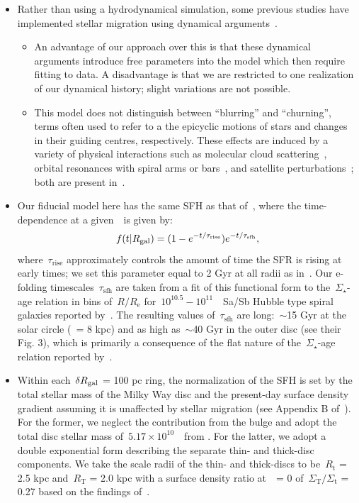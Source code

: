\documentclass[ms.tex]{subfiles}
\begin{document}
\begin{itemize}
	\item Rather than using a hydrodynamical simulation, some previous studies 
	have implemented stellar migration using dynamical 
	arguments~\citep[e.g.][]{Schoenrich2009, Sharma2020}. 
	\begin{itemize} 
		\item An advantage of our approach over this is that these dynamical 
		arguments introduce free parameters into the model which then require 
		fitting to data. 
		A disadvantage is that we are restricted to one realization of our 
		dynamical history; slight variations are not possible. 

		\item This model does not distinguish between ``blurring'' and 
		``churning'', terms often used to refer to a the epicyclic motions of 
		stars and changes in their guiding centres, respectively. 
		These effects are induced by a variety of physical interactions such as 
		molecular cloud scattering~\citep{Mihalas1981, Jenkins1990, 
		Jenkins1992}, orbital resonances with spiral arms or 
		bars~\citep{Sellwood2002, Minchev2011}, and satellite 
		perturbations~\citep{Bird2012}; both are present in~\hsim. 
	\end{itemize} 

	\item Our fiducial model here has the same SFH as that 
	of~\citet{Johnson2021}, where the time-dependence at a given~\rgal~is given 
	by: 
	\begin{equation} 
	f(t|R_\text{gal}) = (1 - e^{-t/\tau_\text{rise}})e^{-t/\tau_\text{sfh}}, 
	\end{equation} 
	where~$\tau_\text{rise}$ approximately controls the amount of time the SFR 
	is rising at early times; we set this parameter equal to 2 Gyr at all 
	radii as in~\citet{Johnson2021}. 
	Our e-folding timescales~$\tau_\text{sfh}$ are taken from a fit of this 
	functional form to the~$\Sigma_\star$-age relation in bins of~$R/R_\text{e}$ 
	for~$10^{10.5} - 10^{11}$~\msun~Sa/Sb Hubble type spiral galaxies reported 
	by~\citet{Sanchez2020}. 
	The resulting values of~$\tau_\text{sfh}$ are long:~$\sim$15 Gyr at the 
	solar circle (\rgal~= 8 kpc) and as high as~$\sim$40 Gyr in the outer disc 
	(see their Fig. 3), which is primarily a consequence of the flat nature 
	of the~$\Sigma_\star$-age relation reported by~\citet{Sanchez2020}. 

	\item Within each~$\delta R_\text{gal}$ = 100 pc ring, the normalization of the SFH 
	is set by the total stellar mass of the Milky Way disc and the present-day 
	surface density gradient assuming it is unaffected by stellar migration 
	(see Appendix B of~\citealt{Johnson2021}). 
	For the former, we neglect the contribution from the bulge and adopt the 
	total disc stellar mass of~$5.17\times10^{10}$~\msun~from 
	\citet{Licquia2015}. 
	For the latter, we adopt a double exponential form describing the separate 
	thin- and thick-disc components. 
	We take the scale radii of the thin- and thick-discs to be~$R_\text{t}$ = 
	2.5 kpc and~$R_\text{T}$ = 2.0 kpc with a surface density ratio at~\rgal~= 0 
	of~$\Sigma_\text{T}/\Sigma_\text{t}$ = 0.27 based on the findings 
	of~\citet{Bland-Hawthorn2016}. 


\end{itemize}
\end{document}
